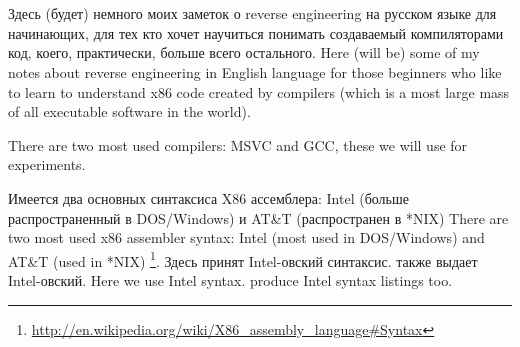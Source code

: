 ﻿\chapter{}

\IFRU
{Здесь (будет) немного моих заметок о reverse engineering на русском языке для начинающих, 
для тех кто хочет научиться понимать создаваемый \CCpp компиляторами код, коего, 
практически, больше всего остального.}
{Here (will be) some of my notes about reverse engineering in English language for 
those beginners who like to learn to understand x86 code created by \CCpp compilers 
(which is a most large mass of all executable software in the world).}

{There are two most used compilers: MSVC and GCC, these we will use for experiments.}

\IFRU
{Имеется два основных синтаксиса X86 ассемблера: Intel (больше распространенный в DOS/Windows) и 
AT\&T (распространен в *NIX)}
{There are two most used x86 assembler syntax: Intel (most used in DOS/Windows) and AT\&T (used in *NIX)}
\footnote{\url{http://en.wikipedia.org/wiki/X86_assembly_language\#Syntax}}. 
\IFRU
{Здесь принят Intel-овский синтаксис. \IDA также выдает Intel-овский.}
{Here we use Intel syntax. \IDA produce Intel syntax listings too.}
